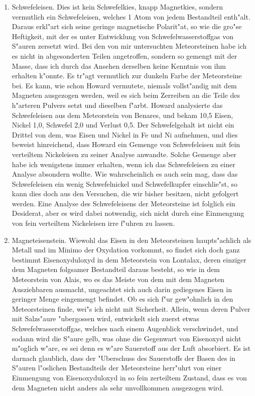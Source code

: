 \documentclass[a4paper, 11pt, oneside]{article}
\begin{document}
\begin{enumerate}
    \item Schwefeleisen. Dies ist kein Schwefelkies, knapp Magnetkies, sondern vermutlich ein Schwefeleisen, welches 1 Atom von jedem Bestandteil enth"alt. Daraus erkl"art sich seine geringe magnetische Polarit"at, so wie die gro"se Heftigkeit, mit der es unter Entwicklung von Schwefelwasserstoffgas von S"auren zersetzt wird. Bei den von mir untersuchten Meteorsteinen habe ich es nicht in abgesonderten Teilen angetroffen, sondern so gemengt mit der Masse, dass ich durch das Ansehen derselben keine Kenntnis von ihm erhalten k"onnte. Es tr"agt vermutlich zur dunkeln Farbe der Meteorsteine bei. Es kann, wie schon Howard vermutete, niemals vollst"andig mit dem Magneten ausgezogen werden, weil es sich beim Zerreiben an die Teile des h"arteren Pulvers setzt und dieselben f"arbt. Howard analysierte das Schwefeleisen aus dem Meteorstein von Benares, und bekam 10,5 Eisen, Nickel 1,0, Schwefel 2,0 und Verlust 0,5. Der Schwefelgehalt ist nicht ein Drittel von dem, was Eisen und Nickel in Fe und Ni aufnehmen, und dies beweist hinreichend, dass Howard ein Gemenge von Schwefeleisen mit fein verteiltem Nickeleisen zu seiner Analyse anwandte. Solche Gemenge aber habe ich wenigstens immer erhalten, wenn ich das Schwefeleisen zu einer Analyse absondern wollte. Wie wahrscheinlich es auch sein mag, dass das Schwefeleisen ein wenig Schwefelnickel und Schwefelkupfer einschlie"st, so kann dies doch aus den Versuchen, die wir bisher besitzen, nicht gefolgert werden. Eine Analyse des Schwefeleisens der Meteorsteine ist folglich ein Desiderat, aber es wird dabei notwendig, sich nicht durch eine Einmengung von fein verteiltem Nickeleisen irre f"uhren zu lassen.
    \item Magneteisenstein. Wiewohl das Eisen in den Meteorsteinen haupts"achlich als Metall und im Minimo der Oxydation vorkommt, so findet sich doch ganz bestimmt Eisenoxyduloxyd in dem Meteorstein von Lontalax, deren einziger dem Magneten folgsamer Bestandteil daraus besteht, so wie in dem Meteorstein von Alais, wo es das Meiste von dem mit dem Magneten Ausziehbaren ausmacht, ungeachtet sich auch darin gediegenes Eisen in geringer Menge eingemengt befindet. Ob es sich f"ur gew"ohnlich in den Meteorsteinen finde, wei"s ich nicht mit Sicherheit. Allein, wenn deren Pulver mit Salzs"aure "ubergossen wird, entwickelt sich zuerst etwas Schwefelwasserstoffgas, welches nach einem Augenblick verschwindet, und sodann wird die S"aure gelb, was ohne die Gegenwart von Eisenoxyd nicht m"oglich w"are, es sei denn es w"are Sauerstoff aus der Luft absorbiert. Es ist darnach glaublich, dass der "Uberschuss des Sauerstoffs der Basen des in S"auren l"oslichen Bestandteils der Meteorsteine herr"uhrt von einer Einmengung von Eisenoxyduloxyd in so fein zerteiltem Zustand, dass es von dem Magneten nicht anders als sehr unvollkommen ausgezogen wird.

\end{enumerate}
\end{document}
